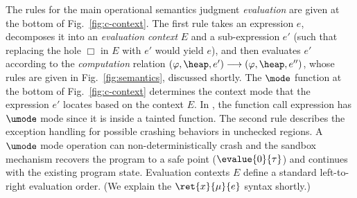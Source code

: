 The rules for the main operational semantics
judgment \emph{evaluation} are given at the bottom of
Fig.~\ref{fig:c-context}.
The first rule takes an expression $e$, decomposes
it into an \emph{evaluation context} $E$ and a sub-expression $e'$
(such that replacing the hole $\Box$ in $E$ with $e'$ would yield
$e$), and then evaluates $e'$ according to the \emph{computation}
  relation $(\varphi,\heap,e') \longrightarrow (\varphi,\heap,e'')$,
whose rules are given in Fig.~\ref{fig:semantics}, discussed
shortly.
The $\mode$ function  at the bottom of Fig.~\ref{fig:c-context}
determines the context mode that the expression $e'$ locates based on the context $E$.
In , the function call expression  has $\umode$ mode since it is inside a tainted function.
The second rule describes the exception handling 
for possible crashing behaviors in unchecked regions.
A $\umode$ mode operation can non-deterministically crash
and the \systemname sandbox mechanism recovers
the program to a safe point ($\evalue{0}{\tau}$)
and continues with the existing program state.
Evaluation contexts $E$ define a standard left-to-right evaluation order. (We explain the
$\ret{x}{\mu}{e}$ syntax shortly.)


